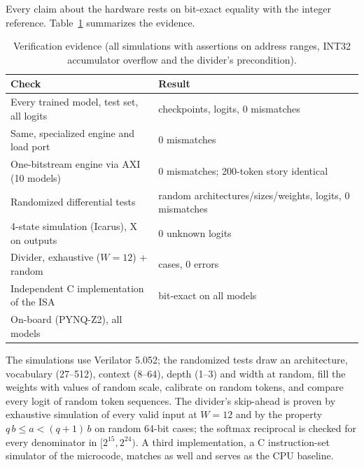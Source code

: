 Every claim about the hardware rests on bit-exact equality with the integer reference. Table~\ref{tab:verif} summarizes
the evidence.

\begin{table}[t]
\centering\footnotesize
\caption{Verification evidence (all simulations with assertions on address ranges, INT32 accumulator overflow and the
divider's precondition).}
\label{tab:verif}
\setlength{\tabcolsep}{3pt}
\begin{tabular}{@{}p{}p{}@{}}
\toprule
Check & Result \\ \midrule
Every trained model, test set, all logits & \zooVerifRuns{} checkpoints, \zooVerifiedLogits{} logits, 0 mismatches \\
Same, specialized engine and load port & 0 mismatches \\
One-bitstream engine via AXI (10 models) & 0 mismatches; 200-token story identical \\
Randomized differential tests & \zooFuzzCases{} random architectures/sizes/weights, \zooFuzzLogits{} logits, 0 mismatches \\
4-state simulation (Icarus), X on outputs & 0 unknown logits \\
Divider, exhaustive ($W{=}12$) + random & \zooArithCases{} cases, 0 errors \\
Independent C implementation of the ISA & bit-exact on all models \\
On-board (PYNQ-Z2), all models & \zooBoardVerif{} \\ \bottomrule
\end{tabular}
\end{table}

The simulations use Verilator 5.052; the randomized tests draw an architecture, vocabulary (27--512), context (8--64),
depth (1--3) and width at random, fill the weights with values of random scale, calibrate on random tokens, and compare
every logit of random token sequences. The divider's skip-ahead is proven by exhaustive simulation of every valid input
at $W=12$ and by the property $q\,b\le a<(q+1)\,b$ on random 64-bit cases; the softmax reciprocal is checked for every
denominator in $[2^{15},2^{24})$. A third implementation, a C instruction-set simulator of the microcode, matches as well
and serves as the CPU baseline.
